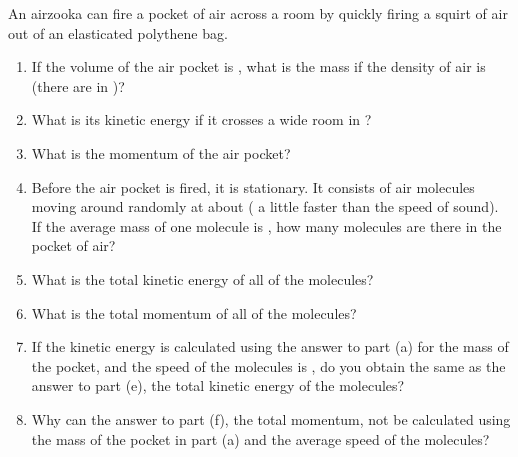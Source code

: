 
\begin{problem}[Robin9]
{An airzooka can fire a pocket of air across a room by quickly firing a squirt of air out of an elasticated polythene bag. 
\begin{enumerate}
	\item If the volume of the air pocket is , what is the mass if the density of air is  (there are  in )?
	\item What is its kinetic energy if it crosses a  wide room in ?
	\item What is the momentum of the air pocket?
	\item Before the air pocket is fired, it is stationary.  It consists of air molecules moving around randomly at about  ( a little faster than the speed of sound).  If the average mass of one molecule is , how many molecules are there in the  pocket of air?
	\item What is the total kinetic energy of all of the molecules?
	\item What is the total momentum of all of the molecules?
	\item If the kinetic energy is calculated using the answer to part (a) for the mass of the pocket, and the speed of the molecules is , do you obtain the same as the answer to part (e), the total kinetic energy of the molecules?
	\item Why can the answer to part (f), the total momentum, not be calculated using the mass of the pocket in part (a) and the  average speed of the molecules?
\end{enumerate}
}
{}
{}
\end{problem}
